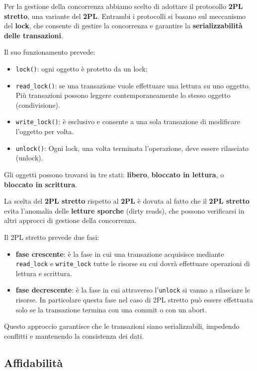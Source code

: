 Per la gestione della concorrenza abbiamo scelto di adottare il protocollo \textbf{2PL stretto}, una variante del \textbf{2PL}. Entrambi i protocolli si basano sul meccanismo del \textbf{lock}, che consente di gestire la concorrenza e garantire la \textbf{serializzabilità delle transazioni}.

Il suo funzionamento prevede:

\begin{itemize}
    \item \texttt{lock()}: ogni oggetto è protetto da un lock;
    \item \texttt{read\_lock()}: se una transazione vuole effettuare una lettura su uno oggetto. Più transazioni possono leggere contemporaneamente lo stesso oggetto (condivisione).
    \item \texttt{write\_lock()}: è esclusivo e consente a una sola transazione di modificare l'oggetto per volta.
    \item \texttt{unlock()}: Ogni lock, una volta terminata l'operazione, deve essere rilasciato (unlock).
\end{itemize}

Gli oggetti possono trovarsi in tre stati: \textbf{libero}, \textbf{bloccato in lettura}, o \textbf{bloccato in scrittura}.

La scelta del \textbf{2PL stretto} rispetto al \textbf{2PL} è dovuta al fatto che il \textbf{2PL stretto} evita l'anomalia delle \textbf{letture sporche} (dirty reads), che possono verificarsi in altri approcci di gestione della concorrenza.

Il 2PL stretto prevede due fasi:

\begin{itemize}
    \item \textbf{fase crescente}: è la fase in cui una transazione acquisisce mediante \texttt{read\_lock} e \texttt{write\_lock} tutte le risorse su cui dovrà effettuare operazioni di lettura e scrittura.
    \item \textbf{fase decrescente}: è la fase in cui attraverso l'\texttt{unlock} si vanno a rilasciare le risorse. In particolare questa fase nel caso di 2PL stretto può essere effettuata solo se la transazione termina con una commit o con un abort.
\end{itemize}

Questo approccio garantisce che le transazioni siano serializzabili, impedendo conflitti e mantenendo la consistenza dei dati.

\subsection{Affidabilità}


